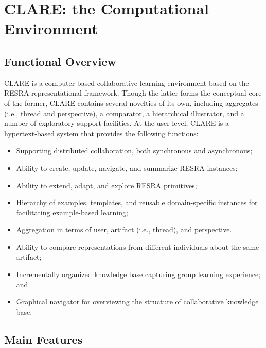 \section{CLARE: the Computational Environment}
\label{sec:clare}

\subsection{Functional Overview}
\label{sec:design-overview}

CLARE is a computer-based collaborative learning environment based on the
RESRA representational framework. Though the latter forms the conceptual
core of the former, CLARE contains several novelties of its own, including
aggregates (i.e., thread and perspective), a comparator, a hierarchical
illustrator, and a number of exploratory support facilities.  At the user
level, CLARE is a hypertext-based system that provides the following
functions:

\begin{itemize}
\item Supporting distributed collaboration, both synchronous and
  asynchronous;
  
\item Ability to create, update, navigate, and summarize RESRA instances;
  
\item Ability to extend, adapt, and explore RESRA primitives;
  
\item Hierarchy of examples, templates, and reusable domain-specific
  instances for facilitating example-based learning;
  
\item Aggregation in terms of user, artifact (i.e., thread), and
  perspective.
  
\item Ability to compare representations from different individuals about
  the same artifact;
  
\item Incrementally organized knowledge base capturing group learning
  experience; and
  
\item Graphical navigator for overviewing the structure of collaborative
  knowledge base.
\end{itemize}


\subsection{Main Features}
\label{sec:features}

